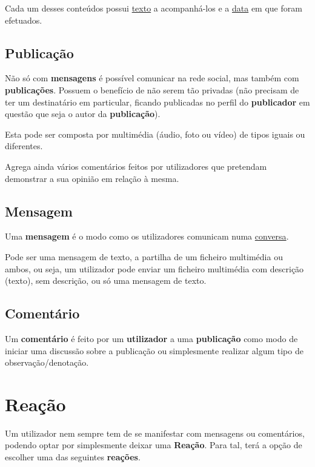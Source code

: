 \documentclass[12pt]{report}
\begin{document}
Cada um desses conteúdos possui \underline{texto} a acompanhá-los e a \underline{data} em que foram efetuados.

\subsection{Publicação}

Não só com \textbf{mensagens} é possível comunicar na rede social, mas também com \textbf{publicações}. Possuem o benefício de não serem tão privadas (não precisam de ter um destinatário em particular, ficando publicadas no perfil do \textbf{publicador} em questão que seja o autor da \textbf{publicação}). \par

Esta pode ser composta por multimédia (áudio, foto ou vídeo) de tipos iguais ou diferentes. \par

Agrega ainda vários comentários feitos por utilizadores que pretendam demonstrar a sua opinião em relação à mesma. \par

\subsection{Mensagem}

Uma \textbf{mensagem} é o modo como os utilizadores comunicam numa \underline{conversa}. \par

Pode ser uma mensagem de texto, a partilha de um ficheiro multimédia ou ambos, ou seja, um utilizador pode enviar um ficheiro multimédia com descrição (texto), sem descrição, ou só uma mensagem de texto. \par

\subsection{Comentário}

Um \textbf{comentário} é feito por um \textbf{utilizador} a uma \textbf{publicação} como modo de iniciar uma discussão sobre a publicação ou simplesmente realizar algum tipo de observação/denotação. \par

\section{Reação}

Um utilizador nem sempre tem de se manifestar com mensagens ou comentários, podendo optar por simplesmente deixar uma \textbf{Reação}. Para tal, terá a opção de escolher uma das seguintes \textbf{reações}.
\end{document}

